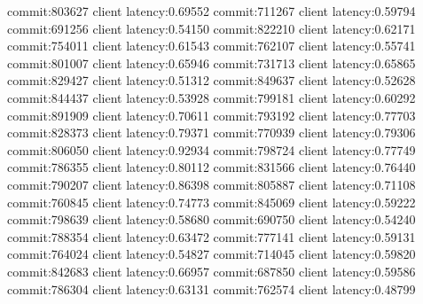 commit:803627 client latency:0.69552
commit:711267 client latency:0.59794
commit:691256 client latency:0.54150
commit:822210 client latency:0.62171
commit:754011 client latency:0.61543
commit:762107 client latency:0.55741
commit:801007 client latency:0.65946
commit:731713 client latency:0.65865
commit:829427 client latency:0.51312
commit:849637 client latency:0.52628
commit:844437 client latency:0.53928
commit:799181 client latency:0.60292
commit:891909 client latency:0.70611
commit:793192 client latency:0.77703
commit:828373 client latency:0.79371
commit:770939 client latency:0.79306
commit:806050 client latency:0.92934
commit:798724 client latency:0.77749
commit:786355 client latency:0.80112
commit:831566 client latency:0.76440
commit:790207 client latency:0.86398
commit:805887 client latency:0.71108
commit:760845 client latency:0.74773
commit:845069 client latency:0.59222
commit:798639 client latency:0.58680
commit:690750 client latency:0.54240
commit:788354 client latency:0.63472
commit:777141 client latency:0.59131
commit:764024 client latency:0.54827
commit:714045 client latency:0.59820
commit:842683 client latency:0.66957
commit:687850 client latency:0.59586
commit:786304 client latency:0.63131
commit:762574 client latency:0.48799